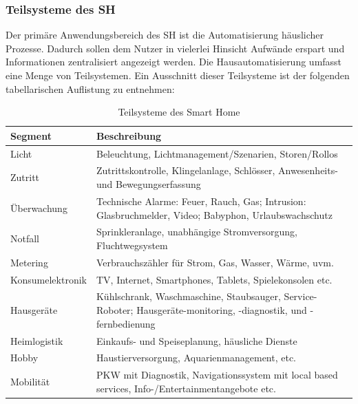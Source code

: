     \subsubsection*{Teilsysteme des \acl{SH}}
    \label{subsubsec:teilsystemeSH}
        Der primäre Anwendungsbereich des \acl{SH} ist die Automatisierung häuslicher Prozesse. Dadurch sollen dem Nutzer 
        in vielerlei Hinsicht Aufwände erspart und Informationen zentralisiert angezeigt werden. Die Hausautomatisierung 
        umfasst eine Menge von Teilsystemen. Ein Ausschnitt dieser Teilsysteme ist der folgenden tabellarischen Auflistung zu entnehmen: 
        \begin{table}[hbt!]
            \begin{center}
                \begin{tabular}{| p{3cm} | p{12.75cm} | }
                    \hline
                        \textbf{Segment} & \textbf{Beschreibung} \\
                    \hline
                        Licht & Beleuchtung, Lichtmanagement/Szenarien, Storen/Rollos \\ 
                    \hline
                        Zutritt & Zutrittskontrolle, Klingelanlage, Schlösser, Anwesenheits- und Bewegungserfassung \\ 
                    \hline
                        Überwachung & Technische Alarme: Feuer, Rauch, Gas; Intrusion: Glasbruchmelder, Video; Babyphon, Urlaubswachschutz \\ 
                    \hline
                        Notfall & Sprinkleranlage, unabhängige Stromversorgung, Fluchtwegsystem \\ 
                    \hline
                        Metering & Verbrauchszähler für Strom, Gas, Wasser, Wärme, uvm. \\ 
                    \hline 
                        Konsumelektronik & TV, Internet, Smartphones, Tablets, Spielekonsolen etc. \\
                    \hline
                        Hausgeräte & Kühlschrank, Waschmaschine, Staubsauger, Service-Roboter; Hausgeräte-monitoring, -diagnostik, und -fernbedienung \\
                    \hline
                        Heimlogistik & Einkaufs- und Speiseplanung, häusliche Dienste \\ 
                    \hline
                        Hobby & Haustierversorgung, Aquarienmanagement, etc. \\
                    \hline
                        Mobilität & PKW mit Diagnostik, Navigationssystem mit local based services, Info-/Entertainmentangebote etc. \\ 
                    \hline
                \end{tabular}
            \end{center}
            \caption{Teilsysteme des Smart Home \cite{strese.2010m}}
            \label{tab:teilsysteme}
        \end{table}
